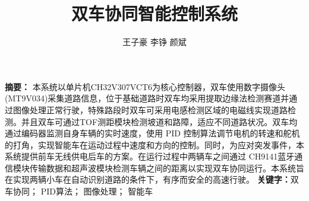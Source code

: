 \documentclass{article}%
\title{\heiti 双车协同智能控制系统}
\author{\kaishu 王子豪 \hspace{1em} 李铮 \hspace{1em} 颜斌}
\affil{(杭州电子科技大学\quad 电子信息学院， 浙江杭州， 310018)}
\date{}%
\begin{document}
	\maketitle	
	\noindent\textbf{摘要：}
	本系统以单片机CH32V307VCT6为核心控制器，双车使用数字摄像头(MT9V034)采集道路信息，位于基础道路时双车均采用提取边缘法检测赛道并通过图像处理正常行驶，特殊路段时双车可采用电感检测区域的电磁线实现道路检测。并且双车可通过TOF测距模块检测坡道和路障，适应不同道路状况。双车均通过编码器监测自身车辆的实时速度，使用 PID 控制算法调节电机的转速和舵机的打角，实现智能车在运动过程中速度和方向的控制。同时，为应对突发事件，本系统提供前车无线供电后车的方案。在运行过程中两辆车之间通过 CH9141蓝牙通信模块传输数据和超声波模块检测车辆之间的距离以实现双车协同运行。本系统旨在实现两辆小车在自动识别道路的条件下，有序而安全的高速行驶。
	\newline%
	\textbf{关键字：}双车协同； PID算法； 图像处理； 智能车
	
	\setcounter{section}{-1}%
		
\end{document}
